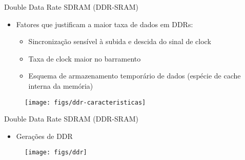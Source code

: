 \begin{slide}{Double Data Rate SDRAM (DDR-SRAM)}
	\begin{itemize}
		\item Fatores que justificam a maior taxa de dados em DDRs:
			\begin{itemize}
				\item Sincronização sensível à subida e descida do sinal de clock
				\item Taxa de clock maior no barramento
				\item Esquema de armazenamento temporário de dados (espécie de cache interna da memória)
			\end{itemize}
	\end{itemize}
	\begin{figure}[h]
		\centering
		\texttt{[image: figs/ddr-caracteristicas]}
	\end{figure}

\end{slide}

\begin{slide}{Double Data Rate SDRAM (DDR-SRAM)}
	\begin{itemize}
		\item Gerações de DDR 
	\end{itemize}
	\begin{figure}[h]
		\centering
		\texttt{[image: figs/ddr]}
	\end{figure}
\end{slide}

%
%
%
%



